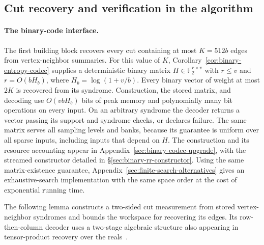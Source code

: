 \documentclass[11pt,letterpaper]{article}
\numberwithin{equation}{section}
\begin{document}
\subsection{Cut recovery and verification in the algorithm}
\label{sec:unrestricted-cut-interface}

\paragraph{The binary-code interface.}
The first building block recovers every cut containing at most $K=512b$ edges from vertex-neighbor summaries.
For this value of $K$, Corollary~\ref{cor:binary-entropy-codec} supplies a deterministic binary matrix $H\in\mathbb F_2^{r\times v}$ with $r\le v$ and $r=O(bH_b)$, where $H_b=\log(1+v/b)$.
Every binary vector of weight at most $2K$ is recovered from its syndrome.
Construction, the stored matrix, and decoding use $O(vbH_b)$ bits of peak memory and polynomially many bit operations on every input.
On an arbitrary syndrome the decoder returns a vector passing its support and syndrome checks, or declares failure.
The same matrix serves all sampling levels and banks, because its guarantee is uniform over all sparse inputs, including inputs that depend on $H$.
The construction and its resource accounting appear in Appendix~\ref{sec:binary-codec-upgrade}, with the streamed constructor detailed in \S\ref{sec:binary-rr-constructor}.
Using the same matrix-existence guarantee, Appendix~\ref{sec:finite-search-alternatives} gives an exhaustive-search implementation with the same space order at the cost of exponential running time.

The following lemma constructs a two-sided cut measurement from stored vertex-neighbor syndromes and bounds the workspace for recovering its edges.
Its row-then-column decoder uses a two-stage algebraic structure also appearing in tensor-product recovery over the reals~\cite[Section~II-B]{HeJoseph2025Hierarchical}.
\end{document}
